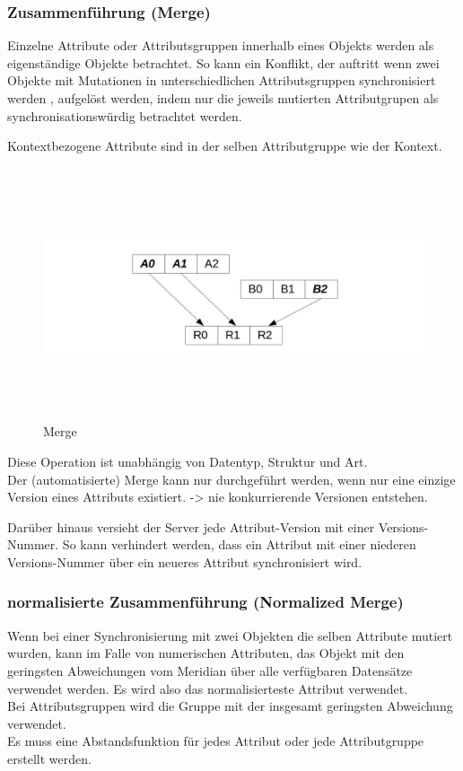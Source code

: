 \documentclass[oneside,11pt,parskip=half,ngerman]{scrreprt}
\makeatletter
\def\maxwidth{\ifdim\Gin@nat@width>\linewidth\linewidth
\else\Gin@nat@width\fi}
\let\Oldincludegraphics\includegraphics
\renewcommand{\includegraphics}[1]{\Oldincludegraphics[width=\maxwidth,height=20em,keepaspectratio]{#1}}
\makeatother
\begin{document}
\subsubsection{Zusammenführung (Merge)}\label{zusammenfuxfchrung-merge}

Einzelne Attribute oder Attributsgruppen innerhalb eines Objekts werden
als eigenständige Objekte betrachtet. So kann ein Konflikt, der auftritt
wenn zwei Objekte mit Mutationen in unterschiedlichen Attributsgruppen
synchronisiert werden , aufgelöst werden, indem nur die jeweils
mutierten Attributgrupen als synchronisationswürdig betrachtet werden.

Kontextbezogene Attribute sind in der selben Attributgruppe wie der
Kontext.

\begin{figure}[htbp]
\centering
\includegraphics{./img/merge.jpg}
\caption{Merge}
\end{figure}

Diese Operation ist unabhängig von Datentyp, Struktur und Art.\\Der
(automatisierte) Merge kann nur durchgeführt werden, wenn nur eine
einzige Version eines Attributs existiert. -\textgreater{} nie
konkurrierende Versionen entstehen.

Darüber hinaus versieht der Server jede Attribut-Version mit einer
Versions-Nummer. So kann verhindert werden, dass ein Attribut mit einer
niederen Versions-Nummer über ein neueres Attribut synchronisiert wird.

\subsubsection{normalisierte Zusammenführung (Normalized
Merge)}\label{normalisierte-zusammenfuxfchrung-normalized-merge}

Wenn bei einer Synchronisierung mit zwei Objekten die selben Attribute
mutiert wurden, kann im Falle von numerischen Attributen, das Objekt mit
den geringsten Abweichungen vom Meridian über alle verfügbaren
Datensätze verwendet werden. Es wird also das normalisierteste Attribut
verwendet.\\Bei Attributsgruppen wird die Gruppe mit der insgesamt
geringsten Abweichung verwendet.\\Es muss eine Abstandsfunktion für
jedes Attribut oder jede Attributgruppe erstellt werden.
\end{document}
